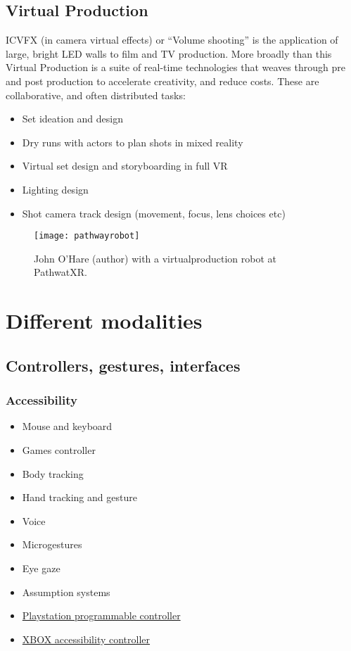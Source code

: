 \subsection{Virtual Production}

ICVFX (in camera virtual effects) or ``Volume shooting'' is the application of large, bright LED walls to film and TV production. More broadly than this Virtual Production is a suite of real-time technologies that weaves through pre and post production to accelerate creativity, and reduce costs.
These are collaborative, and often distributed tasks:
\begin{itemize}
\item Set ideation and design
\item Dry runs with actors to plan shots in mixed reality
\item Virtual set design and storyboarding in full VR
\item Lighting design
\item Shot camera track design (movement, focus, lens choices etc)
\end{itemize}
\begin{figure}[ht]
  \centering
    \texttt{[image: pathwayrobot]}
  \caption{John O'Hare (author) with a virtualproduction robot at PathwatXR.}
  \label{fig:pathwayrobot}
\end{figure}
\section{Different modalities}
\subsection{Controllers, gestures, interfaces}
\subsubsection{Accessibility}
\begin{itemize}
\item Mouse and keyboard
\item Games controller
\item Body tracking
\item Hand tracking and gesture
\item Voice
\item Microgestures
\item Eye gaze
\item Assumption systems
\item \href{https://blog.playstation.com/2023/01/04/introducing-project-leonardo-for-playstation-5-a-highly-customizable-accessibility-controller-kit/}{Playstation programmable controller}
\item \href{https://www.xbox.com/en-GB/accessories/controllers/xbox-adaptive-controller}{XBOX accessibility controller}
\end{itemize}
